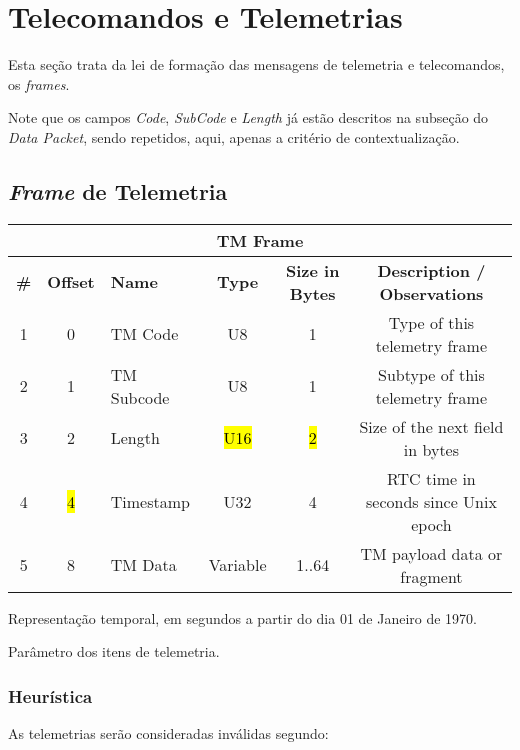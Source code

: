 \section{Telecomandos e Telemetrias}

Esta seção trata da lei de formação das mensagens de telemetria e telecomandos, os \textit{frames}.

Note que os campos \textit{Code}, \textit{SubCode} e \textit{Length} já estão descritos na subseção do \textit{Data Packet}, sendo repetidos, aqui, apenas a critério de contextualização.

\subsection{\textit{Frame} de Telemetria}

\begin{table}[H]
\begin{tabular}{|cclccc|}
\hline
\multicolumn{6}{|c|}{\textbf{TM Frame}} \\ \hline
\textbf{\#} & \textbf{Offset} & \textbf{Name} & \textbf{Type} & \textbf{Size in Bytes} & \textbf{Description / Observations} \\ \hline
1 & 0 & TM Code & U8 & 1 & Type of this telemetry frame \\
2 & 1 & TM Subcode & U8 & 1 & Subtype of this telemetry frame \\
3 & 2 & Length & \hl{U16} & \hl{2} & Size of the next field in bytes \\ \hline
4 & \hl{4} & Timestamp & U32 & 4 & RTC time in seconds since Unix epoch \\
5 & 8 & TM Data & Variable & 1..64 & TM payload data or fragment \\ \hline
\end{tabular}
\end{table}

\begin{description}[align=right]
    \item[Timestamp] Representação temporal, em segundos a partir do dia 01 de Janeiro de 1970.
    \item[TM Data] Parâmetro dos itens de telemetria.
\end{description}

\subsubsection{Heurística}

As telemetrias serão consideradas inválidas segundo:

